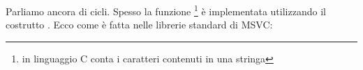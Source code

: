 Parliamo ancora di cicli. Spesso la funzione  
\footnote{in linguaggio C conta i caratteri contenuti in una stringa} 
è implementata utilizzando il costrutto .
Ecco come è fatta nelle librerie standard di MSVC:
